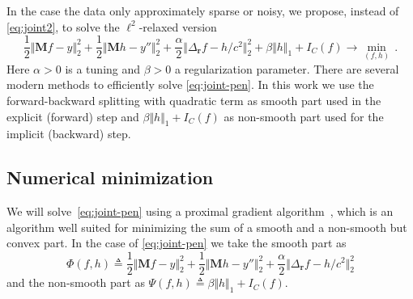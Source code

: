 \documentclass[11pt]{article}
\newcommand{\rr}{\mathbf r}
\newcommand{\data}{y}
\newcommand{\source}{f}
\newcommand{\Lsource}{h}
\newcommand\norm[1]{\Vert#1\Vert}
\newcommand{\fullop}{\mathbf M}
\begin{document}
In the case the data only approximately sparse or noisy, we propose, instead of
\eqref{eq:joint2}, to solve the    $\ell^2$-relaxed version
\begin{equation} \label{eq:joint-pen}
\frac{1}{2} \norm{\fullop \source- \data}_2^2
+
\frac{1}{2} \norm{\fullop\Lsource - \data''}_2^2
+
\frac{\alpha}{2} \norm{\Delta_{\rr} \source  -    \Lsource/c^{2}}_2^2
+
\beta \norm{\Lsource}_1  +  I_{C} (\source)
\to \min_{(\source, \Lsource)} \,.
\end{equation}
Here $\alpha>0$ is a tuning and  $\beta >0$ a regularization
parameter. There are several modern methods to efficiently solve
\eqref{eq:joint-pen}. In this work we use the forward-backward splitting
with quadratic term as smooth part used in  the explicit (forward) step and
$ \beta \norm{\Lsource}_1  +  I_{C} (\source) $ as non-smooth part used for
the implicit (backward) step.



\subsection{Numerical minimization}


We will solve~\eqref{eq:joint-pen} using a proximal gradient
algorithm~\cite{combettes2011proximal}, which is an  algorithm
well suited for minimizing  the sum  of a smooth and a non-smooth but convex part.
In the case of  \eqref{eq:joint-pen}  we take the smooth part as
\begin{equation}
\Phi(\source,\Lsource) \triangleq  \frac{1}{2} \norm{\fullop \source- \data}_2^2
+
\frac{1}{2} \norm{\fullop\Lsource - \data''}_2^2
+
\frac{\alpha}{2} \norm{\Delta_{\rr} \source  -    \Lsource/c^{2}}_2^2
\end{equation}
and the  non-smooth part as $\Psi(f,h) \triangleq \beta \norm{\Lsource}_1  +  I_{C}(f)$.
\end{document}
